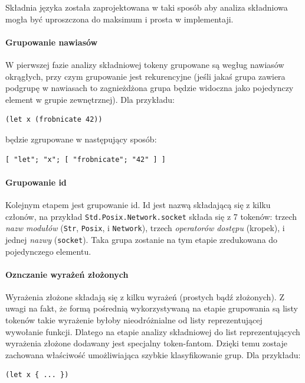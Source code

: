 \documentclass[11pt,oneside,a4paper,titlepage,onecolumn]{article}
\begin{document}
Składnia języka została zaprojektowana w taki sposób aby analiza składniowa mogła być uproszczona do maksimum
i prosta w implementaji.

\paragraph{Grupowanie nawiasów}

W pierwszej fazie analizy składniowej tokeny grupowane są wegług nawiasów okrągłych, przy czym grupowanie jest
rekurencyjne (jeśli jakaś grupa zawiera podgrupę w nawiasach to zagnieżdżona grupa będzie widoczna jako
pojedynczy element w grupie zewnętrznej).
Dla przykładu:

\begin{lstlisting}
(let x (frobnicate 42))
\end{lstlisting}

będzie zgrupowane w następujący sposób:

\begin{lstlisting}
[ "let"; "x"; [ "frobnicate"; "42" ] ]
\end{lstlisting}

\paragraph{Grupowanie id}

Kolejnym etapem jest grupowanie id. Id jest nazwą składającą się z kilku członów, na przykład
\texttt{Std.Posix.Network.socket} składa się z 7 tokenów: trzech \emph{nazw modułów} (\texttt{Str},
\texttt{Posix}, i \texttt{Network}), trzech \emph{operatorów dostępu} (kropek), i jednej \emph{nazwy}
(\texttt{socket}).
Taka grupa zostanie na tym etapie zredukowana do pojedynczego elementu.

\paragraph{Oznczanie wyrażeń złożonych}

Wyrażenia złożone składają się z kilku wyrażeń (prostych bądź złożonych). Z uwagi na fakt, że formą pośrednią
wykorzystywaną na etapie grupowania są listy tokenów takie wyrażenie byłoby nieodróżnialne od listy
reprezentującej wywołanie funkcji. Dlatego na etapie analizy składniowej do list reprezentujących wyrażenia
złożone dodawany jest specjalny token-fantom. Dzięki temu zostaje zachowana właściwość umożliwiająca szybkie
klasyfikowanie grup. Dla przykładu:

\begin{lstlisting}
(let x { ... })
\end{lstlisting}
\end{document}
